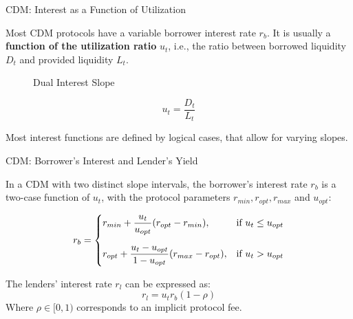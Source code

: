 \documentclass[handout]{beamer}
\begin{document}
\begin{frame}{CDM: Interest as a Function of Utilization }

Most CDM protocols have a variable borrower interest rate $r_b$. It is usually a \textbf{function of the utilization ratio} $u_t$, i.e., the ratio between borrowed liquidity $D_t$ and provided liquidity $L_t$.

\vspace{1.5em}

 {
\begin{minipage}{0.6\textwidth}
	\begin{figure}[t]
		\centering
		\begin{tikzpicture}[scale=0.5, every node/.style={scale=0.8}]
			
		\end{tikzpicture}
		\caption{Dual Interest Slope}
	\end{figure}
\end{minipage}
\begin{minipage}{0.38\textwidth}
	\vspace{-1em}
	\begin{equation*}
		u_t = \dfrac{D_t}{L_t}
	\end{equation*}
	
	\vspace{0.5 em}
	Most interest functions are defined by logical cases, that allow for varying slopes. 
	
\end{minipage}	
}

\end{frame}


\begin{frame}{CDM: Borrower's Interest and Lender's Yield }

In a CDM with two distinct slope intervals, the borrower's interest rate $r_b$ is a two-case function of $u_t$, with the protocol parameters $r_{min}, r_{opt}, r_{max}$ and $u_{opt}$:

\begin{equation*}
	r_b = 
		\begin{cases}
		r_{min} + \dfrac{u_t}{u_{opt}}(r_{opt}-r_{min}), & \text{if } u_t \leq u_{opt} \vspace{1em}\\
		r_{opt} + \dfrac{u_t-u_{opt}}{1-u_{opt}}(r_{max}-r_{opt}), & \text{if } u_t > u_{opt}
		\end{cases}
\end{equation*}

\vspace{1em}

 {
The lenders' interest rate $r_l$ can be expressed as:
%
\begin{equation*}
	r_l = u_t r_b (1-\rho) 
\end{equation*}
%
Where $\rho \in [0,1)$ corresponds to an implicit protocol fee.
}

\end{frame}
\end{document}
